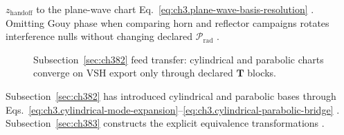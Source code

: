 \(z_{\mathrm{handoff}}\) to the plane-wave chart Eq.~\eqref{eq:ch3.plane-wave-basis-resolution} \cite{hansen1988}. Omitting Gouy
phase when comparing horn and reflector campaigns rotates interference nulls without changing declared \(\mathcal{P}_{\mathrm{rad}}\)
\cite{harrington2001}.
\begin{figure}[t]
\centering
{}
\caption{Subsection~\ref{sec:ch382} feed transfer: cylindrical and parabolic charts converge on VSH export only through declared $\mathbf{T}$ blocks.}
\label{fig:ch3.382-feed-transfer}
\end{figure}
Subsection~\ref{sec:ch382} has introduced cylindrical and parabolic bases through
Eqs.~\eqref{eq:ch3.cylindrical-mode-expansion}--\eqref{eq:ch3.cylindrical-parabolic-bridge}
\cite{stratton1941}. Subsection~\ref{sec:ch383} constructs the explicit equivalence transformations
\cite{hansen1988}.
